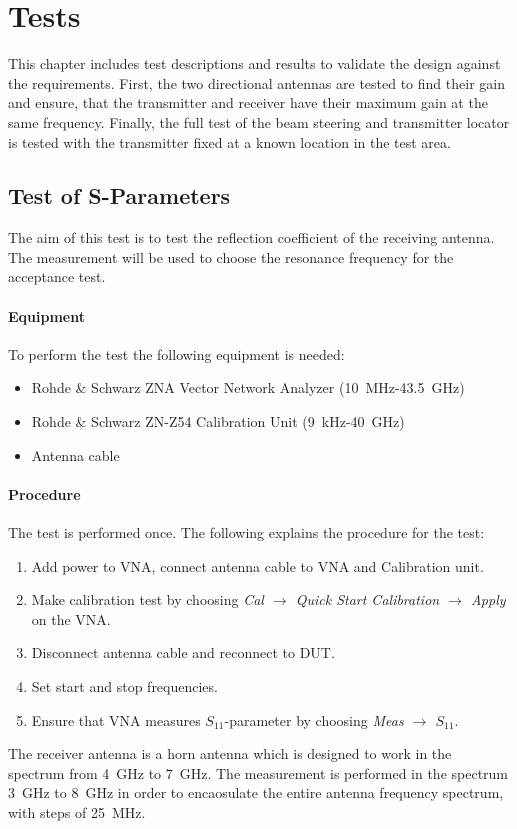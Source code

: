 \chapter{Tests}
This chapter includes test descriptions and results to validate the design against the requirements. First, the two directional antennas are tested to find their gain and ensure, that the transmitter and receiver have their maximum gain at the same frequency. Finally, the full test of the beam steering and transmitter locator is tested with the transmitter fixed at a known location in the test area.

\section{Test of S-Parameters} \label{s:sparam_test}
The aim of this test is to test the reflection coefficient of the receiving antenna. The measurement will be used to choose the resonance frequency for the acceptance test.

\subsubsection{Equipment}
To perform the test the following equipment is needed:
\begin{itemize}
    \item Rohde \& Schwarz ZNA Vector Network Analyzer (\SI{10}{\mega\hertz}-\SI{43.5}{\giga\hertz})
    \item Rohde \& Schwarz ZN-Z54 Calibration Unit (\SI{9}{\kilo\hertz}-\SI{40}{\giga\hertz})
    \item Antenna cable
\end{itemize}

\subsubsection{Procedure}
The test is performed once. The following explains the procedure for the test:
\begin{enumerate}
    \item Add power to VNA, connect antenna cable to VNA and Calibration unit.
    \item Make calibration test by choosing \textit{Cal $\rightarrow$ Quick Start Calibration $\rightarrow$ Apply} on the VNA.
    \item Disconnect antenna cable and reconnect to DUT.
    \item Set start and stop frequencies. 
    \item Ensure that VNA measures $S_{11}$-parameter by choosing \textit{Meas $\rightarrow$ $S_{11}$}.
\end{enumerate}
The receiver antenna is a horn antenna which is designed to work in the spectrum from \SI{4}{\giga\hertz} to \SI{7}{\giga\hertz}. The measurement is performed in the spectrum \SI{3}{\giga\hertz} to \SI{8}{\giga\hertz} in order to encaosulate the entire antenna frequency spectrum, with steps of \SI{25}{\mega\hertz}. 

